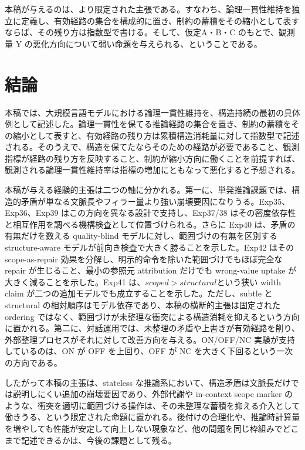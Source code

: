 \documentclass[12pt,a4paper]{article}
\begin{document}
本稿が与えるのは、より限定された主張である。すなわち、論理一貫性維持を独立に定義し、有効経路の集合を構成的に置き、制約の蓄積をその縮小として表すならば、その残り方は指数型で書ける。そして、仮定A・B・C のもとで、観測量 Y の悪化方向について弱い命題を与えられる、ということである。

\section{結論}\label{ux7d50ux8ad6}

本稿では、大規模言語モデルにおける論理一貫性維持を、構造持続の最初の具体例として記述した。論理一貫性を保てる推論経路の集合を置き、制約の蓄積をその縮小として表すと、有効経路の残り方は累積構造消耗量に対して指数型で記述される。そのうえで、構造を保てたならそのための経路が必要であること、観測指標が経路の残り方を反映すること、制約が縮小方向に働くことを前提すれば、観測される論理一貫性維持率は指標の増加にともなって悪化すると予想される。

本稿が与える経験的主張は二つの軸に分かれる。第一に、単発推論課題では、構造的矛盾が単なる文脈長やフィラー量より強い崩壊要因になりうる。Exp35、Exp36、Exp39 はこの方向を異なる設計で支持し、Exp37/38 はその密度依存性と相互作用を調べる機構検査として位置づけられる。さらに Exp40 は、矛盾の有無だけを数える quality-blind モデルに対し、範囲づけの有無を区別する structure-aware モデルが前向き検査で大きく勝ることを示した。Exp42 はその scope-as-repair 効果を分解し、明示的命令を除いた範囲づけでもほぼ完全な repair が生じること、最小の参照元 attribution だけでも wrong-value uptake が大きく減ることを示した。Exp41 は、\(scoped > structural\)という狭い width claim が二つの追加モデルでも成立することを示した。ただし、subtle と structural の相対順序はモデル依存であり、本稿の横断的主張は固定された ordering ではなく、範囲づけが未整理な衝突による構造消耗を抑えるという方向に置かれる。第二に、対話運用では、未整理の矛盾や上書きが有効経路を削り、外部整理プロセスがそれに対して改善方向を与える。ON/OFF/NC 実験が支持しているのは、ON が OFF を上回り、OFF が NC を大きく下回るという一次の方向である。

したがって本稿の主張は、stateless な推論系において、構造矛盾は文脈長だけでは説明しにくい追加の崩壊要因であり、外部代謝や in-context scope marker のような、衝突を適切に範囲づける操作は、その未整理な蓄積を抑える介入として働きうる、という限定された命題に置かれる。後付けの合理化や、推論時計算量を増やしても性能が安定して向上しない現象など、他の問題を同じ枠組みでどこまで記述できるかは、今後の課題として残る。
\end{document}
